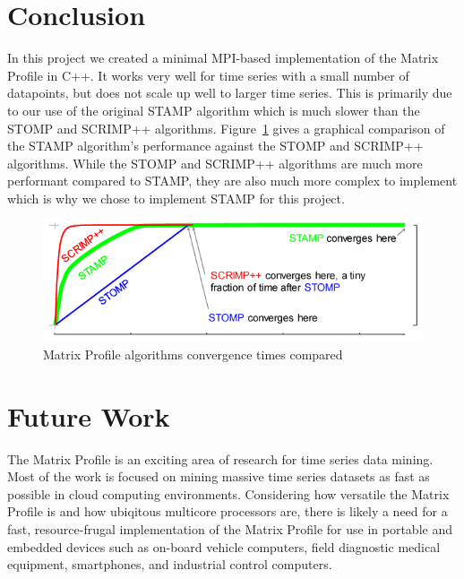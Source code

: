 \documentclass[conference]{IEEEtran}
\begin{document}
\section{Conclusion}
In this project we created a minimal MPI-based implementation of the Matrix Profile in C++.  It works very well for time series with a small number of datapoints, but does not scale up well to larger time series.  This is primarily due to our use of the original STAMP algorithm which is much slower than the STOMP and SCRIMP++ algorithms. Figure~\ref{fig:matrix_profile_algorithms_compared} gives a graphical comparison of the STAMP algorithm's performance against the STOMP and SCRIMP++ algorithms.  While the STOMP and SCRIMP++ algorithms are much more performant compared to STAMP, they are also much more complex to implement which is why we chose to implement STAMP for this project. 

\begin{figure}
\begin{center}
\includegraphics[scale=0.85]{matrix_profile_algorithms_compared.png}
\caption{Matrix Profile algorithms convergence times compared}
\label{fig:matrix_profile_algorithms_compared}
\end{center}
\end{figure}

\section{Future Work}
The Matrix Profile is an exciting area of research for time series data mining.  Most of the work is focused on mining massive time series datasets as fast as possible in cloud computing environments.  Considering how versatile the Matrix Profile is and how ubiqitous multicore processors are, there is likely a need for a fast, resource-frugal implementation of the Matrix Profile for use in portable and embedded devices such as on-board vehicle computers, field diagnostic medical equipment, smartphones, and industrial control computers.  
\end{document}
